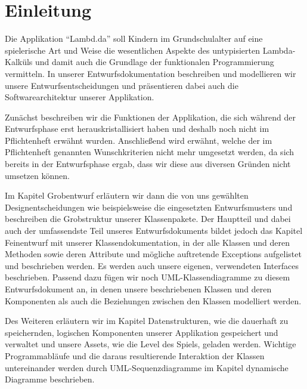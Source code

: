 \section{Einleitung}

Die Applikation "`Lambd.da"' soll Kindern im Grundschulalter auf eine spielerische Art und Weise die wesentlichen Aspekte des untypisierten Lambda-Kalküls und damit auch die Grundlage der funktionalen Programmierung vermitteln. In unserer Entwurfsdokumentation beschreiben und modellieren wir unsere Entwurfsentscheidungen und präsentieren dabei auch die Softwarearchitektur unserer Applikation.

Zunächst beschreiben wir die Funktionen der Applikation, die sich während der Entwurfsphase erst herauskristallisiert haben und deshalb noch nicht im Pflichtenheft erwähnt wurden. Anschließend wird erwähnt, welche der im Pflichtenheft genannten Wunschkriterien nicht mehr umgesetzt werden, da sich bereits in der Entwurfsphase ergab, dass wir diese aus diversen Gründen nicht umsetzen können.

Im Kapitel Grobentwurf erläutern wir dann die von uns gewählten Designentscheidungen wie beispielsweise die eingesetzten Entwurfsmusters und beschreiben die Grobstruktur unserer Klassenpakete. Der Hauptteil und dabei auch der umfassendste Teil unseres Entwurfsdokuments bildet jedoch das Kapitel Feinentwurf mit unserer Klassendokumentation, in der alle Klassen und deren Methoden sowie deren Attribute und mögliche auftretende Exceptions aufgelistet und beschrieben werden. Es werden auch unsere eigenen, verwendeten Interfaces beschrieben. Passend dazu fügen wir noch UML-Klassendiagramme zu diesem Entwurfsdokument an, in denen unsere beschriebenen Klassen und deren Komponenten als auch die Beziehungen zwischen den Klassen modelliert werden.

Des Weiteren erläutern wir im Kapitel Datenstrukturen, wie die dauerhaft zu speichernden, logischen Komponenten unserer Applikation gespeichert und verwaltet und unsere Assets, wie die Level des Spiels, geladen werden. Wichtige Programmabläufe und die daraus resultierende Interaktion der Klassen untereinander werden durch UML-Sequenzdiagramme im Kapitel dynamische Diagramme beschrieben.
